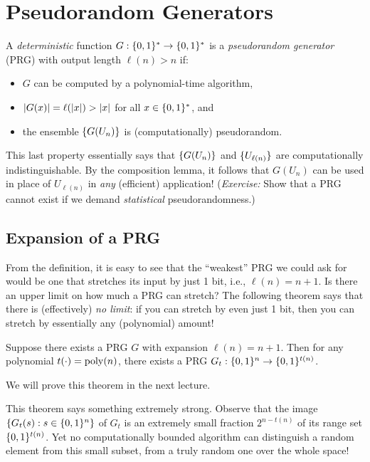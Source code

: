 \documentclass[11pt]{article}
\begin{document}
\section{Pseudorandom Generators}
\label{sec:prgs}

\begin{definition}
  \label{def:prg}
  A \emph{deterministic} function $G : \{0,1\}^{*} \to \{0,1\}^{*}$ is a
  \emph{pseudorandom generator} (PRG) with output length $\ell(n) > n$
  if:
  \begin{itemize}
  \item $G$ can be computed by a polynomial-time algorithm,
  \item $\lvert G(x)\rvert = \ell(\lvert x\rvert) > \lvert x\rvert$ for all $x \in
    \{0,1\}^{*}$, and
  \item the ensemble $\{G(U_{n})\}$ is (computationally)
    pseudorandom.
  \end{itemize}
  
  This last property essentially says that $\{G(U_{n})\}$ and
  $\{U_{\ell(n)}\}$ are computationally indistinguishable. By the
  composition lemma, it follows that $G(U_{n})$ can be used in place
  of $U_{\ell(n)}$ in \emph{any} (efficient) application!
  (\emph{Exercise:} Show that a PRG cannot exist if we demand
  \emph{statistical} pseudorandomness.)
\end{definition}

\subsection{Expansion of a PRG}
\label{sec:properties}

From the definition, it is easy to see that the ``weakest'' PRG we
could ask for would be one that stretches its input by just 1 bit,
i.e., $\ell(n) = n+1$.  Is there an upper limit on how much a PRG can
stretch?  The following theorem says that there is (effectively)
\emph{no limit}: if you can stretch by even just 1 bit, then you can
stretch by essentially any (polynomial) amount!

\begin{theorem}
  \label{thm:expansion}
  Suppose there exists a PRG $G$ with expansion $\ell(n)=n+1$.  Then
  for any polynomial $t(\cdot) = \operatorname{poly}(n)$, there exists a PRG $G_t:
  \{0,1\}^n \to \{0,1\}^{t(n)}$.
\end{theorem}

\noindent
We will prove this theorem in the next lecture.

\begin{remark}
  This theorem says something extremely strong.  Observe that the
  image $\{G_{t}(s) : s \in \{0,1\}^{n}\}$ of $G_t$ is an extremely
  small fraction $2^{n-t(n)}$ of its range set $\{0,1\}^{t(n)}$.  Yet no
  computationally bounded algorithm can distinguish a random element
  from this small subset, from a truly random one over the whole
  space!
\end{remark}
  
\end{document}
